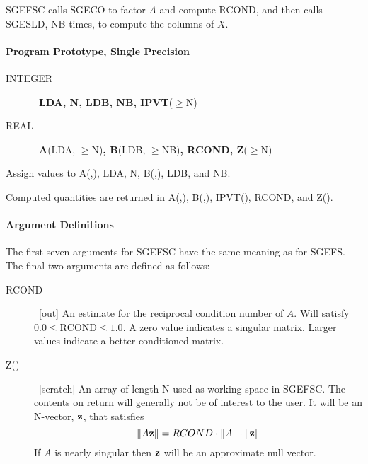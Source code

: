 \documentclass[twoside]{MATH77}
\begin{document}
SGEFSC calls SGECO to factor $A$ and compute RCOND, and then calls SGESLD, NB
times, to compute the columns of $X$.

\paragraph{Program Prototype, Single Precision}

\begin{description}

\item[INTEGER] \ {\bf LDA, N, LDB, NB, IPVT}($\geq $N)

\item[REAL] \ {\bf A}(LDA, $\geq $N){\bf , B}(LDB, $\geq $NB){\bf , RCOND,
Z}($\geq $N)

\end{description}

Assign values to A(,), LDA, N, B(,), LDB, and NB.

\begin{center}
\end{center}

Computed quantities are returned in A(,), B(,), IPVT(), RCOND, and Z().

\paragraph{Argument Definitions}

The first seven arguments for SGEFSC have the same meaning as for SGEFS. The
final two arguments are defined as follows:
\begin{description}
\item[RCOND] \ [out] An estimate for the reciprocal condition number of $A$.
Will satisfy $0.0 \leq \text{RCOND} \leq 1.0$. A zero value indicates a
singular matrix. Larger values indicate a better conditioned matrix.

\item[Z()] \ [scratch] An array of length N used as working space in SGEFSC. The
contents on return will generally not be of interest to the user. It will be
an N-vector, ${\bf z}$, that satisfies
\begin{equation*}
\|A{\bf z}\| = RCOND \cdot \|A\| \cdot \|{\bf z}\|
\end{equation*}
If $A$ is nearly singular then ${\bf z}$ will be an approximate null vector.
\end{description}
\end{document}
